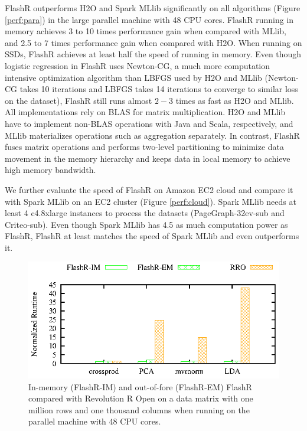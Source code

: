 FlashR outperforms H2O and Spark MLlib significantly on all algorithms
(Figure \ref{perf:para}) in the large parallel machine with 48 CPU cores.
FlashR running in memory achieves 3 to 10 times performance gain when compared
with MLlib, and 2.5 to 7 times performance gain when compared with H2O.
When running on SSDs, FlashR achieves at least half the speed of running in
memory. Even though logistic regression in FlashR uses Newton-CG, a much more
computation intensive optimization algorithm than LBFGS \cite{lbfgs} used by
H2O and MLlib (Newton-CG takes 10 iterations and LBFGS takes 14 iterations
to converge to similar loss on the dataset), FlashR still runs almost $2-3$
times as fast as H2O and MLlib. All implementations rely on BLAS for
matrix multiplication. H2O and MLlib have to
implement non-BLAS operations with Java and Scala, respectively, and
MLlib materializes operations such as aggregation separately. In contrast,
FlashR fuses matrix operations and performs two-level partitioning to
minimize data movement in the memory hierarchy and keeps data in local
memory to achieve high memory bandwidth.

We further evaluate the speed of FlashR on Amazon EC2 cloud and compare it with
Spark MLlib on an EC2 cluster (Figure \ref{perf:cloud}). Spark MLlib needs
at least 4 c4.8xlarge instances to process the datasets (PageGraph-32ev-sub
and Criteo-sub).
Even though Spark MLlib has 4.5 as much computation power as FlashR, FlashR
at least matches the speed of Spark MLlib and even outperforms it.

\begin{figure}[b]
  \vspace{-10pt}
	\begin{center}
		\footnotesize
		\includegraphics{FlashMatrix_figs/FlashR-vs-RRO.eps}
		\caption{In-memory (FlashR-IM) and out-of-fore (FlashR-EM) FlashR
		compared with Revolution R Open on a data matrix with one million rows
		and one thousand columns when running on the parallel machine with
		48 CPU cores.}
		\label{fig:fmR}
	\end{center}
  \vspace{-15pt}
\end{figure}

